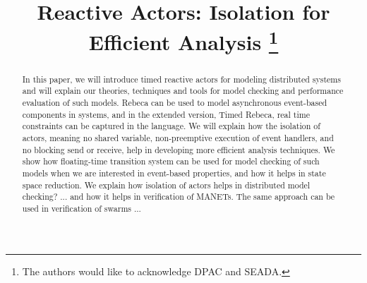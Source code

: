 \documentclass[conference]{IEEEtran}
\begin{document}
	
	\title{%
	Reactive Actors: Isolation for Efficient Analysis 
		\thanks{The authors would like to acknowledge DPAC and SEADA.}
	}
	
	\author{
		\and
		\and
	}
	
	\maketitle
	
	\begin{abstract}
		In this paper, we will introduce timed reactive actors for modeling distributed systems and will explain our theories, techniques and tools for model checking and performance evaluation of such models.  Rebeca can be used to model asynchronous event-based components in systems, and in the extended version, Timed Rebeca, real time constraints can be captured in the language. We will explain how the isolation of actors, meaning no shared variable, non-preemptive execution of event handlers, and no blocking send or receive, help in developing more efficient analysis techniques. We show how floating-time transition system can be used for model checking of such models when we are interested in event-based properties, and how it helps in state space reduction. We explain how isolation of actors helps in distributed model checking? ... and how it helps in verification of MANETs. The same approach can be used in verification of swarms ...
		
	\end{abstract}
	
\end{document}
